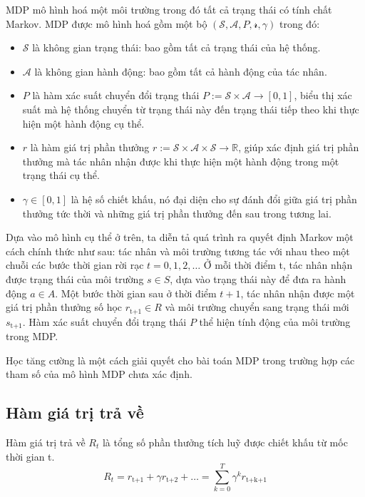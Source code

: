 \documentclass{uetgraduation}
\begin{document}
MDP mô hình hoá một môi trường trong đó tất cả trạng thái có tính chất Markov. MDP được mô hình hoá gồm một bộ $(\mathcal{S}, \mathcal{A}, P, \mathcal{r}, \gamma)$ trong đó:
\begin{itemize}
    \item $\mathcal{S}$ là không gian trạng thái: bao gồm tất cả trạng thái của hệ thống.
    \item $\mathcal{A}$ là không gian hành động: bao gồm tất cả hành động của tác nhân.
    \item $P$ là hàm xác suất chuyển đổi trạng thái $P := \mathcal{S} \times \mathcal{A} \to [0, 1] $, biểu thị xác suất mà hệ thống chuyển từ trạng thái này đến trạng thái tiếp theo khi thực hiện
    một hành động cụ thể.
    \item $r$ là hàm giá trị phần thưởng $r := \mathcal{S} \times \mathcal{A} \times \mathcal{S} \to \mathbb{R}$, giúp xác định giá trị phần thưởng mà tác nhân nhận được khi thực hiện một hành động
    trong một trạng thái cụ thể.
    \item $\gamma \in [0, 1]$ là hệ số chiết khấu, nó đại diện cho sự đánh đổi giữa giá trị phần thưởng tức thời và những giá trị phần thưởng đến sau trong tương lai.
\end{itemize}

Dựa vào mô hình cụ thể ở trên, ta diễn tả quá trình ra quyết định Markov một cách chính thức như sau: tác nhân và môi trường tương tác với nhau theo một chuỗi các bước thời gian rời rạc
$t = 0, 1, 2,\dots$ Ở mỗi thời điểm t, tác nhân nhận được trạng thái của môi trường $s \in S$, dựa vào trạng thái này để đưa ra hành động $a \in A$. Một bước thời gian sau ở thời điểm $t+1$,
tác nhân nhận được một giá trị phần thưởng số học $r_\text{t+1} \in R$ và môi trường chuyển sang trạng thái mới $s_\text{t+1}$. Hàm xác suất chuyển đổi trạng thái $P$ thể hiện tính động của
môi trường trong MDP.

Học tăng cường là một cách giải quyết cho bài toán MDP trong trường hợp các tham số của mô hình MDP chưa xác định.

\subsection{Hàm giá trị trả về}
Hàm giá trị trả về $R_t$ là tổng số phần thưởng tích luỹ được chiết khấu từ mốc thời gian t.
\begin{equation}
    R_t = r_\text{t+1} + \gamma r_\text{t+2} + \dots = \sum_{k=0}^{T} \gamma^k r_\text{t+k+1}
    \label{eq:R_t}
\end{equation}
\end{document}
